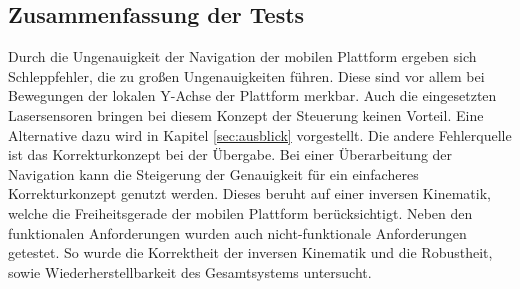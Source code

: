 \subsection{Zusammenfassung der Tests}
Durch die Ungenauigkeit der Navigation der mobilen Plattform ergeben sich Schleppfehler, die zu großen Ungenauigkeiten führen. Diese sind vor allem bei Bewegungen der lokalen Y-Achse der Plattform merkbar. Auch die eingesetzten Lasersensoren bringen bei diesem Konzept der Steuerung keinen Vorteil. Eine Alternative dazu wird in Kapitel \ref{sec:ausblick} vorgestellt. Die andere Fehlerquelle ist das Korrekturkonzept bei der Übergabe. Bei einer Überarbeitung der Navigation kann die Steigerung der Genauigkeit für ein einfacheres Korrekturkonzept genutzt werden. Dieses beruht auf einer inversen Kinematik, welche die Freiheitsgerade der mobilen Plattform berücksichtigt. Neben den funktionalen Anforderungen wurden auch nicht-funktionale Anforderungen getestet. So wurde die Korrektheit der inversen Kinematik und die Robustheit, sowie Wiederherstellbarkeit des Gesamtsystems untersucht.
